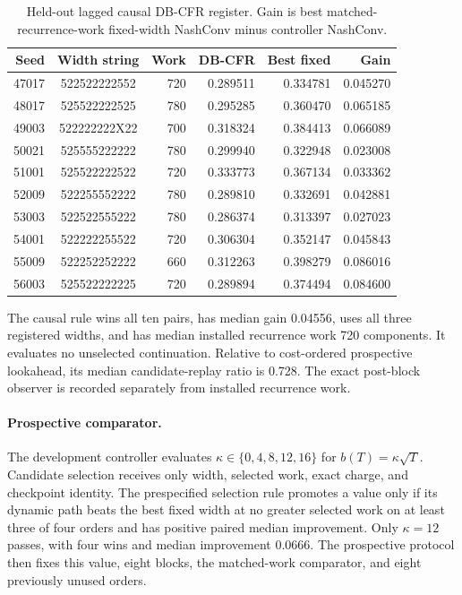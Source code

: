 \begin{table}[h]
\caption{Held-out lagged causal DB-CFR register.  Gain is best
matched-recurrence-work fixed-width NashConv minus controller NashConv.}
\label{tab:app-causal-controller}
\centering\scriptsize
\setlength{\tabcolsep}{2.8pt}
\begin{tabular}{@{}rcrrrr@{}}
\toprule
Seed & Width string & Work & DB-CFR & Best fixed & Gain \\
\midrule
47017 & 522522222552 & 720 & 0.289511 & 0.334781 & 0.045270 \\
48017 & 525522222525 & 780 & 0.295285 & 0.360470 & 0.065185 \\
49003 & 522222222X22 & 700 & 0.318324 & 0.384413 & 0.066089 \\
50021 & 525555222222 & 780 & 0.299940 & 0.322948 & 0.023008 \\
51001 & 525522222522 & 720 & 0.333773 & 0.367134 & 0.033362 \\
52009 & 522255552222 & 780 & 0.289810 & 0.332691 & 0.042881 \\
53003 & 522522555222 & 780 & 0.286374 & 0.313397 & 0.027023 \\
54001 & 522222255522 & 720 & 0.306304 & 0.352147 & 0.045843 \\
55009 & 522252252222 & 660 & 0.312263 & 0.398279 & 0.086016 \\
56003 & 525522222225 & 720 & 0.289894 & 0.374494 & 0.084600 \\
\bottomrule
\end{tabular}
\end{table}

The causal rule wins all ten pairs, has median gain 0.04556, uses all three
registered widths, and has median installed recurrence work 720 components.
It evaluates no unselected continuation.  Relative to cost-ordered
prospective lookahead, its median candidate-replay ratio is 0.728.  The exact
post-block observer is recorded separately from installed recurrence work.

\paragraph{Prospective comparator.}
The development controller evaluates
$\kappa\in\{0,4,8,12,16\}$ for
$b(T)=\kappa\sqrt T$.  Candidate selection receives only width, selected work,
exact charge, and checkpoint identity.  The prespecified selection rule promotes a
value only if its dynamic path beats the best fixed width at no greater
selected work on at least three of four orders and has positive paired median
improvement.  Only $\kappa=12$ passes, with four wins and median improvement
0.0666.  The prospective protocol then fixes this value, eight blocks, the
matched-work comparator, and eight previously unused orders.

